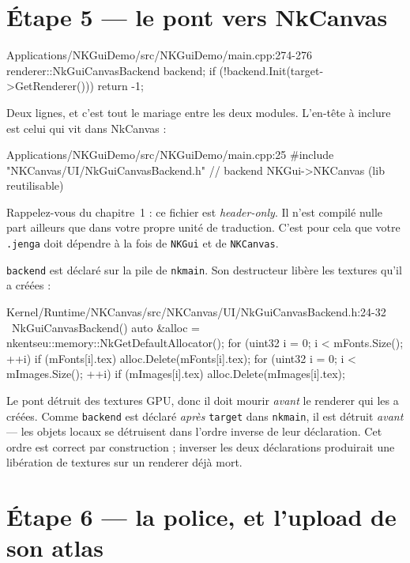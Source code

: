 \section{Étape 5 — le pont vers NkCanvas}

\begin{nkcode}{Applications/NKGuiDemo/src/NKGuiDemo/main.cpp:274-276}
    renderer::NkGuiCanvasBackend backend;
    if (!backend.Init(target->GetRenderer()))
        return -1;
\end{nkcode}

Deux lignes, et c'est tout le mariage entre les deux modules. L'en-tête à inclure
est celui qui vit dans NkCanvas :

\begin{nkcode}{Applications/NKGuiDemo/src/NKGuiDemo/main.cpp:25}
#include "NKCanvas/UI/NkGuiCanvasBackend.h" // backend NKGui->NKCanvas (lib reutilisable)
\end{nkcode}

Rappelez-vous du chapitre~1 : ce fichier est \emph{header-only}. Il n'est compilé
nulle part ailleurs que dans votre propre unité de traduction. C'est pour cela
que votre \texttt{.jenga} doit dépendre à la fois de \texttt{NKGui} et de
\texttt{NKCanvas}.

\texttt{backend} est déclaré sur la pile de \texttt{nkmain}. Son destructeur
libère les textures qu'il a créées :

\begin{nkcode}{Kernel/Runtime/NKCanvas/src/NKCanvas/UI/NkGuiCanvasBackend.h:24-32}
~NkGuiCanvasBackend() {
    auto &alloc = nkentseu::memory::NkGetDefaultAllocator();
    for (uint32 i = 0; i < mFonts.Size();  ++i) if (mFonts[i].tex)  alloc.Delete(mFonts[i].tex);
    for (uint32 i = 0; i < mImages.Size(); ++i) if (mImages[i].tex) alloc.Delete(mImages[i].tex);
}
\end{nkcode}

\begin{nkpiege}
Le pont détruit des textures GPU, donc il doit mourir \emph{avant} le renderer
qui les a créées. Comme \texttt{backend} est déclaré \emph{après} \texttt{target}
dans \texttt{nkmain}, il est détruit \emph{avant} — les objets locaux se
détruisent dans l'ordre inverse de leur déclaration. Cet ordre est correct par
construction ; inverser les deux déclarations produirait une libération de
textures sur un renderer déjà mort.
\end{nkpiege}

\section{Étape 6 — la police, et l'upload de son atlas}

